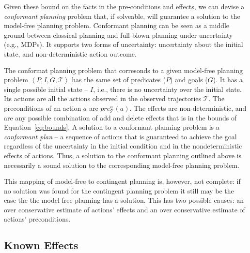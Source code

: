 \documentclass[letterpaper]{article}
\newcommand{\tuple}[1]{\ensuremath{\left \langle #1 \right \rangle }}
\begin{document}
Given these bound on the facts in the pre-conditions and effects, we can devise a {\em conformant planning} problem that, if solveable, will guarantee a solution to the model-free planning problem. Conformant planning can be seen as a middle ground between classical planning and full-blown planning under uncertainty (e.g., MDPs). It supports two forms of uncertainty: uncertainty about the initial state, and non-deterministic action outcome. %

The conformat planning problem that corresonds to a given model-free planning problem $\tuple{P,I,G, \mathcal{T}}$ has the same set of predicates ($P$) and goals ($G$). It has a single possible initial state -- $I$, i.e., there is no uncertainty over the initial state. Its actions are all the actions observed in the observed trajectories $\mathcal{T}$. The preconditions of an action $a$ are $pre_\mathcal{T}^u(a)$. The effects are non-deterministic, and are any possible combination of 
add and delete effects that is in the bounds of Equation~\ref{eq:bounds}. A solution to a conformant planning problem is a {\em conformant plan} -- a sequence of actions that is guaranteed to achieve the goal regardless of the uncertainty in the initial condition and in the nondeterministic effects of actions. Thus, a solution to the conformant planning outlined above is necessarily a sound solution to the corresponding model-free planning problem. 


This mapping of model-free to contingent planning is, however, not complete: if no solution was found for the contingent planning problem it still may be the case the the model-free planning has a solution. This has two possible causes: an over conservative estimate of actions' effects and an over conservative estimate of actions' preconditions. 

\subsection{Known Effects}

 
\end{document}
